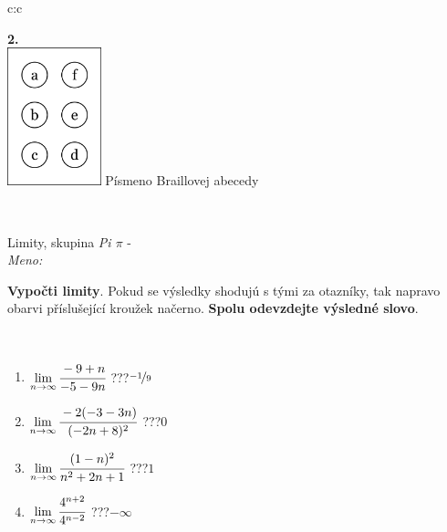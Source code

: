 \documentclass[10pt]{report}
\begin{document}
\begin{tabular}{c:c}
\begin{minipage}[c][104.5mm][t]{0.5\linewidth}
\begin{center}
\begin{minipage}{0.20\linewidth}
\begin{center}
{\Huge\bfseries 2.} \\[2mm]
\includegraphics[height=40mm]{../images/braille.png}
{\small Písmeno Braillovej abecedy}
\end{center}
\end{minipage}
\end{center}
\end{minipage}
\\ \hdashline
\begin{minipage}[c][104.5mm][t]{0.5\linewidth}
\begin{center}
\vspace{7mm}
{\huge Limity, skupina \textit{Pi $\pi$} -}\\[5mm]
\textit{Meno:}\phantom{xxxxxxxxxxxxxxxxxxxxxxxxxxxxxxxxxxxxxxxxxxxxxxxxxxxxxxxxxxxxxxxxx}\\[5mm]
\begin{minipage}{0.95\linewidth}
\begin{center}
\textbf{Vypočti limity}. Pokud se výsledky shodujú s tými za otazníky, tak napravo\\obarvi příslušející kroužek načerno. \textbf{Spolu odevzdejte výsledné slovo}.
\end{center}
\end{minipage}
\\[1mm]
\begin{minipage}{0.79\linewidth}
\begin{center}
\begin{varwidth}{\linewidth}
\begin{enumerate}
\normalsize
\item $\lim\limits_{n\to\infty}\cfrac{-9+n}{-5-9n}$\quad \dotfill\; ???\;\dotfill \quad $\nicefrac{-1}{9}$
\item $\lim\limits_{n\to\infty}\cfrac{-2(-3-3n)}{(-2n+8)^2}$\quad \dotfill\; ???\;\dotfill \quad $0$
\item $\lim\limits_{n\to\infty}\cfrac{(1-n)^2}{n^2+2n+1}$\quad \dotfill\; ???\;\dotfill \quad $1$
\item $\lim\limits_{n\to\infty}\cfrac{4^{n+2}}{4^{n-2}}$\quad \dotfill\; ???\;\dotfill \quad $-\infty$

\end{enumerate}
\end{varwidth}
\end{center}
\end{minipage}
\end{center}
\end{minipage}
\end{tabular}
\end{document}
